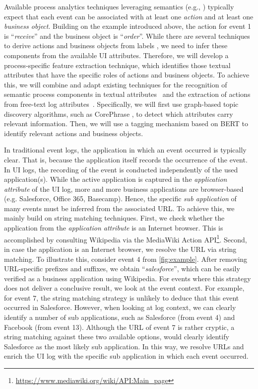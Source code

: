  Available process analytics techniques leveraging semantics (e.g., \cite{leopold2012probabilistic,leopold2015_jss,van2021natural}) typically expect that each event can be associated with at least one \textit{action} and at least one \textit{business object}. Building on the example introduced above, the action for event 1 is ``\textit{receive}'' and the business object is ``\textit{order}''. While there are several techniques to derive actions and business objects from labels \cite{leopold2012refactoring,leopold2019using,rebmann2021extracting}, we need to infer these components from the available UI attributes. Therefore, we will develop a process-specific feature extraction technique, which identifies those textual attributes that have the specific roles of actions and business objects. To achieve this, we will combine and adapt existing techniques for the recognition of semantic process components in textual attributes~\cite{rebmann2021extracting} and the extraction of actions from free-text log attributes~\cite{gupta2020analyzing}. Specifically, we will first use graph-based topic discovery algorithms, such as CorePhrase \cite{hammouda2005corephrase}, to detect which attributes carry relevant information. Then, we will use a tagging mechanism based on BERT \cite{Devlin2019} to identify relevant actions and business objects. 

 In traditional event logs, the application in which an event occurred is typically clear. That is, because the application itself records the occurrence of the event. In UI logs, the recording of the event is conducted independently of the used application(s). While the active application is captured in the \textit{application attribute} of the UI log, more and more business applications are browser-based (e.g. Salesforce, Office 365, Basecamp). Hence, the specific \textit{sub application} of many events must be inferred from the associated URL. To achieve this, we mainly build on string matching techniques. First, we check whether the application from the \textit{application attribute} is an Internet browser. This is accomplished by consulting Wikipedia via the MediaWiki Action API\footnote{\url{https://www.mediawiki.org/wiki/API:Main_page}}. Second, in case the application is an Internet browser, we resolve the URL via string matching. To illustrate this, consider event 4 from \autoref{fig:example}. After removing URL-specific prefixes and suffixes, we obtain ``\textit{salesforce}'', which can be easily verified as a business application using Wikipedia. For events where this strategy does not deliver a conclusive result, we look at the event context. For example, for event 7, the string matching strategy is unlikely to deduce that this event occurred in Salesforce. However, when looking at log context, we can clearly identify a number of sub applications, such as Salesforce (from event 4) and Facebook (from event 13). Although the URL of event 7 is rather cryptic, a string matching against these two available options, would clearly identify Salesforce as the most likely sub application. In this way, we resolve URLs and enrich the UI log with the specific sub application in which each event occurred.  


